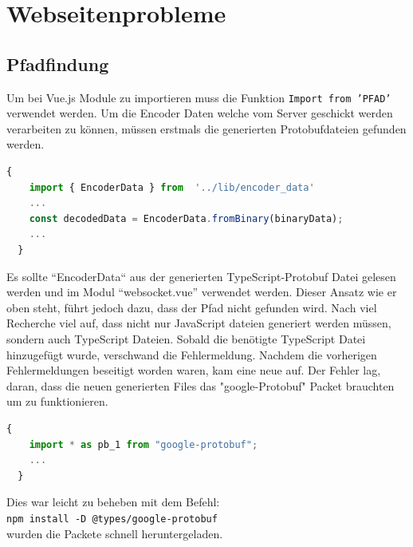 \section{Webseitenprobleme}
\label{subsec:problem_Webseite}

\subsection{Pfadfindung}
\label{subsubsec:problem_Pfadfindung}
Um bei Vue.js Module zu importieren muss die Funktion \texttt{Import from 'PFAD'} verwendet werden.
%
Um die Encoder Daten welche vom Server geschickt werden verarbeiten zu können, 
müssen erstmals die generierten Protobufdateien gefunden werden.
%
\begin{lstlisting}[language=JavaScript,gobble=4]
  {
    import { EncoderData } from  '../lib/encoder_data'
    ...
    const decodedData = EncoderData.fromBinary(binaryData);
    ...
  }
\end{lstlisting}
Es sollte ``EncoderData`` aus der generierten TypeScript-Protobuf Datei gelesen werden und im Modul ``websocket.vue'' verwendet werden.
Dieser Ansatz wie er oben steht, führt jedoch dazu, dass der Pfad nicht gefunden wird. 
%
Nach viel Recherche viel auf, dass nicht nur JavaScript dateien generiert werden müssen, sondern auch TypeScript Dateien.
Sobald die benötigte TypeScript Datei hinzugefügt wurde, verschwand die Fehlermeldung.
%
Nachdem die vorherigen Fehlermeldungen beseitigt worden waren, kam eine neue auf. 
Der Fehler lag, daran, dass die neuen generierten Files das "google-Protobuf" Packet brauchten um zu funktionieren.
% 
\begin{lstlisting}[language=JavaScript,gobble=4]
  {
    import * as pb_1 from "google-protobuf";
    ...
  }
\end{lstlisting}
Dies war leicht zu beheben mit dem Befehl:\\ \texttt{npm install -D @types/google-protobuf} \\ wurden die Packete schnell
heruntergeladen.
